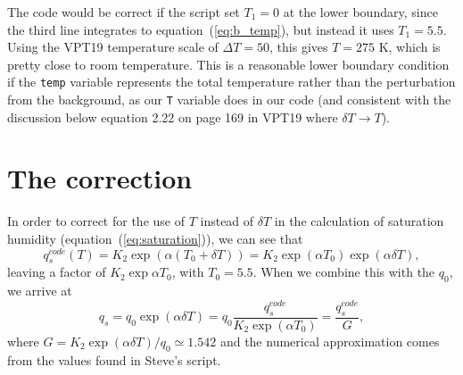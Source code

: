 \documentclass[11pt]{article}
\begin{document}
The code would be correct if the script set $T_1 = 0$ at the lower boundary, since the third line integrates to equation~(\ref{eq:b_temp}), but instead it uses $T_1 = 5.5$. Using the VPT19 temperature scale of $\Delta T = 50$, this gives $T = 275$ K, which is pretty close to room temperature. This is a reasonable lower boundary condition if the \texttt{temp} variable represents the total temperature rather than the perturbation from the background, as our \texttt{T} variable does in our code (and consistent with the discussion below equation 2.22 on page 169 in VPT19 where $\delta T \to T$). 


\section{The correction}
\label{sec:correction}
In order to correct for the use of $T$ instead of $\delta T$ in the calculation of saturation humidity (equation~(\ref{eq:saturation})), we can see that
\begin{equation}
  \label{eq:steve_q}
  q_s^{code}(T) = K_2 \exp{(\alpha (T_0 + \delta T))} = K_2 \exp{(\alpha T_0)} \exp{(\alpha \delta T)},
\end{equation}
leaving a factor of $K_2 \exp{\alpha T_0}$, with $T_0 = 5.5$. When we combine this with the $q_0$, we arrive at
\begin{equation}
  \label{eq:correction_q}
  q_s = q_0 \exp{(\alpha \delta T)} = q_0 \frac{q_s^{code}}{K_2 \exp{(\alpha T_0)}}= \frac{q_s^{code}}{G},
\end{equation}
where $G = K_2 \exp{(\alpha \delta T)}/q_0 \simeq 1.542$ and the numerical approximation comes from the values found in Steve's script.
\end{document}
